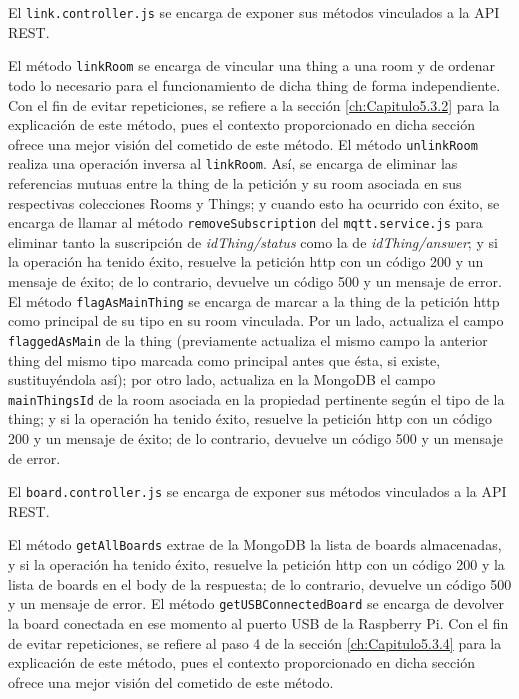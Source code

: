 \vspace{1cm}

El \verb|link.controller.js| se encarga de exponer sus métodos vinculados a la API REST.

\vspace{0.5cm}

El método \verb|linkRoom| se encarga de vincular una thing a una room y de ordenar todo lo necesario para el funcionamiento de dicha thing de forma independiente. Con el fin de evitar repeticiones, se refiere a la sección \ref{ch:Capitulo5.3.2} para la explicación de este método, pues el contexto proporcionado en dicha sección ofrece una mejor visión del cometido de este método.
El método \verb|unlinkRoom| realiza una operación inversa al \verb|linkRoom|. Así, se encarga de eliminar las referencias mutuas entre la thing de la petición y su room asociada en sus respectivas colecciones Rooms y Things; y cuando esto ha ocurrido con éxito, se encarga de llamar al método \verb|removeSubscription| del \verb|mqtt.service.js| para eliminar tanto la suscripción de \textit{idThing/status} como la de \textit{idThing/answer}; y si la operación ha tenido éxito, resuelve la petición http con un código 200 y un mensaje de éxito; de lo contrario, devuelve un código 500 y un mensaje de error.
El método \verb|flagAsMainThing| se encarga de marcar a la thing de la petición http como principal de su tipo en su room vinculada. Por un lado, actualiza el campo \verb|flaggedAsMain| de la thing (previamente actualiza el mismo campo la anterior thing del mismo tipo marcada como principal antes que ésta, si existe, sustituyéndola así); por otro lado, actualiza en la MongoDB el campo \verb|mainThingsId| de la room asociada en la propiedad pertinente según el tipo de la thing; y si la operación ha tenido éxito, resuelve la petición http con un código 200 y un mensaje de éxito; de lo contrario, devuelve un código 500 y un mensaje de error.

\vspace{1cm}

El \verb|board.controller.js| se encarga de exponer sus métodos vinculados a la API REST.

\vspace{0.5cm}

El método \verb|getAllBoards| extrae de la MongoDB la lista de boards almacenadas, y si la operación ha tenido éxito, resuelve la petición http con un código 200 y la lista de boards en el body de la respuesta; de lo contrario, devuelve un código 500 y un mensaje de error.
El método \verb|getUSBConnectedBoard| se encarga de devolver la board conectada en ese momento al puerto USB de la Raspberry Pi. Con el fin de evitar repeticiones, se refiere al paso 4 de la sección \ref{ch:Capitulo5.3.4} para la explicación de este método, pues el contexto proporcionado en dicha sección ofrece una mejor visión del cometido de este método.

